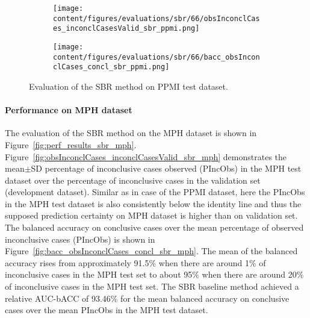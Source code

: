 \begin{figure}[ht]
  \begin{subfigure}{0.49\textwidth}
    \centering
    \texttt{[image: content/figures/evaluations/sbr/66/obsInconclCases\_inconclCasesValid\_sbr\_ppmi.png]}
    \label{fig:obsInconclCases_inconclCasesValid_sbr_ppmi}
  \end{subfigure}
  \hfill
  \begin{subfigure}{0.49\textwidth}
    \centering
    \texttt{[image: content/figures/evaluations/sbr/66/bacc\_obsInconclCases\_concl\_sbr\_ppmi.png]}
    \label{fig:bacc_obsInconclCases_concl_sbr_ppmi}
  \end{subfigure}
  \caption{Evaluation of the SBR method on PPMI test dataset.}
  \label{fig:perf_results_sbr_ppmi}
\end{figure}




\paragraph{Performance on MPH dataset}

The evaluation of the SBR method on the MPH dataset is shown in Figure~\ref{fig:perf_results_sbr_mph}.
Figure~\ref{fig:obsInconclCases_inconclCasesValid_sbr_mph} demonstrates 
the mean$\pm$SD percentage of inconclusive cases observed (PIncObs) in the MPH test dataset 
over the percentage of inconclusive cases in the validation set (development dataset).
Similar as in case of the PPMI dataset, here the PIncObs in the MPH test dataset
is also consistently below the identity line 
and thus the supposed prediction certainty on MPH dataset is higher than on validation set.
The balanced accuracy on conclusive cases over the mean percentage of observed inconclusive cases (PIncObs) is shown 
in Figure~\ref{fig:bacc_obsInconclCases_concl_sbr_mph}.
The mean of the balanced accuracy rises from approximately 91.5\% 
when there are around 1\% of inconclusive cases in the MPH test set to about 95\% 
when there are around 20\% of inconclusive cases in the MPH test set.
The SBR baseline method achieved a relative AUC-bACC of 93.46\% for the mean balanced accuracy on conclusive cases 
over the mean PIncObs in the MPH test dataset.


